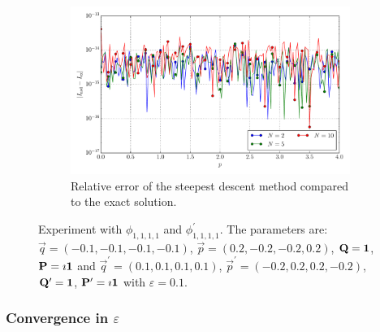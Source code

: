 \documentclass[a4paper,10pt]{article}
\begin{document}
\begin{figure}[ht!]
\begin{subfigure}[t]{0.5\linewidth}
    \includegraphics[width=\linewidth]{./plots/tp_4d_conv_p_(1,1,1,1)_(1,1,1,1)_err_rel_nsd.pdf}
    \caption{Relative error of the steepest descent method compared to the exact solution.}
    \label{fig:tp_4d_conv_p_1111_1111_err_nsd}
  \end{subfigure}
  \label{fig:tp_4d_conv_p_1111_1111}
  \caption{Experiment with $\phi_{1,1,1,1}$ and $\phi_{1,1,1,1}^{\prime}$.
  The parameters are:
  $\vec{q} = (-0.1, -0.1, -0.1, -0.1)$,
  $\vec{p} = ( 0.2, -0.2, -0.2,  0.2)$,
  $\mathbf{Q} = \mathbf{1}$,
  $\mathbf{P} = \imath \mathbf{1}$
  and
  $\vec{q}^\prime = ( 0.1, 0.1, 0.1,  0.1)$,
  $\vec{p}^\prime = (-0.2, 0.2, 0.2, -0.2)$,
  $\mathbf{Q}^\prime = \mathbf{1}$,
  $\mathbf{P}^\prime = \imath \mathbf{1}$
  with $\varepsilon=0.1$.}
\end{figure}


\FloatBarrier
\subsubsection{Convergence in $\varepsilon$}
\end{document}
